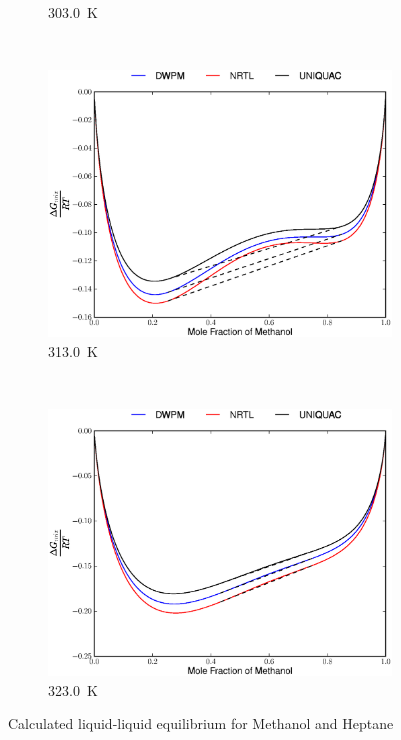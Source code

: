 \begin{figure}[hp]
\begin{subfigure}[h]{0.5\textwidth}
\caption{303.0~$\mathrm{K}$} 
\end{subfigure}%
\\%
\begin{subfigure}[h]{0.5\textwidth}
\centering
\includegraphics[width = \textwidth]{Results_Parts/BinaryParams/methanol-heptane/AllModelsGibbsPlots/T_313.eps}
\caption{313.0~$\mathrm{K}$} 
\end{subfigure}%
~%
\begin{subfigure}[h]{0.5\textwidth}
\centering
\includegraphics[width = \textwidth]{Results_Parts/BinaryParams/methanol-heptane/AllModelsGibbsPlots/T_323.eps}
\caption{323.0~$\mathrm{K}$} \label{methanol-heptane323}
\end{subfigure}%
\caption{Calculated liquid-liquid equilibrium for Methanol and Heptane}
\end{figure}
\vspace*{\fill}
\clearpage

